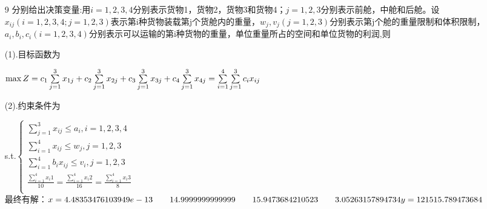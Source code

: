 \documentclass[a4paper,20pt]{article}
\begin{document}
\begin{itemize}
                \item[9]分别给出决策变量:用$i=1,2,3,4$分别表示货物1，货物2，货物3和货物4；$j=1,2,3$分别表示前舱，中舱和后舱。设$x_{ij}(i=1,2,3,4;j=1,2,3)$表示第i种货物装载第j个货舱内的重量，$w_j,v_j(j=1,2,3)$分别表示第j个舱的重量限制和体积限制，$a_i,b_i,c_i(i=1,2,3,4)$分别表示可以运输的第i种货物的重量，单位重量所占的空间和单位货物的利润,则
                \par (1).目标函数为\par $\max Z=c_1\sum\limits_{j=1}^3x_{1j}+c_2\sum\limits_{j=1}^3x_{2j}+c_3\sum\limits_{j=1}^3x_{3j}+c_4\sum\limits_{j=1}^3x_{4j}\\=\sum\limits_{i=1}^4\sum\limits_{j=1}^3c_ix_{ij}$
                \par (2).约束条件为\par s.t.$\left\{\begin{matrix}
                \sum\limits_{j=1}^3x_{ij}\leq a_i,i=1,2,3,4                                                             \\
                \sum\limits_{i=1}^4x_{ij}\leq w_j,j=1,2,3                                                               \\
                \sum\limits_{i=1}^4b_ix_{ij}\leq v_i,j=1,2,3                                                            \\
                \frac{\sum\limits_{i=1}^4x_i1}{10}=\frac{\sum\limits_{i=1}^4x_i2}{16}=\frac{\sum\limits_{i=1}^4x_i3}{8} \\
            \end{matrix}\right.$
                \\最终有解：$x =
            4.48353476103949e-13      \qquad    14.9999999999999      \qquad    15.9473684210523      \\ \qquad   3.05263157894734
            \\y =121515.789473684$

\end{itemize}
\end{document}
